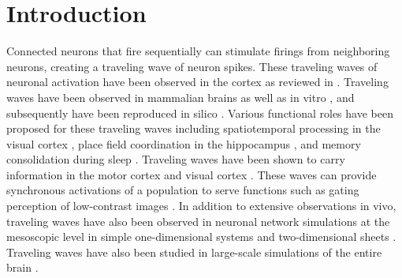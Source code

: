 
\chapter{Introduction}
Connected neurons that fire sequentially can stimulate firings from neighboring neurons, creating a traveling wave of neuron spikes. 
These traveling waves of neuronal activation have been observed in the cortex as reviewed in \citet{Muller2018}.
Traveling waves have been observed in mammalian brains \citep{Golomb1997}\citep{reimer2010}\citep{Sato2012}  as well as in vitro \citep{wu2008}\citep{huang2004}\citep{Golomb1999}, 
and subsequently have been reproduced in silico \citep{keane2015}\citep{Senk2020}\citep{Golomb1996}\citep{ermentrout2001}. 
Various functional roles have been proposed for these traveling waves including spatiotemporal processing in the visual cortex \citep{Chemla2019}\citep{Muller2014}\citep{Nauhaus2009}\citep{Heitmann2020}, 
place field coordination in the hippocampus \citep{lubernov2009}, and memory consolidation during sleep \citep{Dickey2021}.
Traveling waves have been shown to carry information in the  motor cortex \citep{Rubino2006} and visual cortex \citep{Besserve2015}.
These waves can provide synchronous activations of a population to serve functions such as gating perception of low-contrast images \citep{Davis2020}.
In addition to extensive observations in vivo, traveling waves have also been observed in neuronal network simulations at the mesoscopic level 
in simple one-dimensional systems \citep{Wilson1973}\citep{Golomb1999} and two-dimensional sheets \citep{keane2015}\citep{Pyle2017}\citep{Townsend2018}.
Traveling waves have also been studied in large-scale simulations of the entire brain \citep{Roberts2019}.

